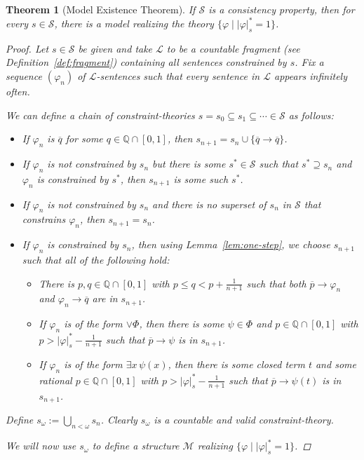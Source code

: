 \documentclass{amsart}
\newtheorem{theorem}{Theorem}[section]
\theoremstyle{definition}
\numberwithin{equation}{theorem}
\renewcommand{\phi}{\varphi}
\newcommand{\Q}{\mathbb{Q}}
\newcommand{\where}{\mid}
\newcommand{\unvee}{{\vee}}
\newcommand{\rat}[1]{{\overline{#1}}}
\newcommand{\narrow}[1]{\xrightarrow{#1}}
\renewcommand{\to}{\narrow{}}
\newcommand{\frag}{\mathcal{L}}
\begin{document}
\begin{theorem}[Model Existence Theorem]
  If $\mathscr{S}$ is a consistency property, then for every $s\in \mathscr{S}$, there is a model realizing the theory $\{\phi\where |\phi|^*_s=1\}$.
  \begin{proof}
    Let $s\in \mathscr{S}$ be given and take $\frag$ to be a countable fragment (see Definition~\ref{def:fragment}) containing all sentences constrained by $s$.
    Fix a sequence $(\phi_n)$ of $\mathcal L$-sentences such that every sentence in $\mathcal L$ appears infinitely often.
    
    We can define a chain of constraint-theories $s=s_0\subseteq s_1\subseteq\cdots\in \mathscr{S}$ as follows:
    \begin{itemize}
    \item If $\phi_n$ is $\rat q$ for some $q\in\Q\cap[0,1]$, then $s_{n+1}=s_n\cup\{\rat q\to\rat q\}$.
    \item If $\phi_n$ is not constrained by $s_n$ but there is some $s^*\in \mathscr{S}$ such that $s^*\supseteq s_n$ and $\phi_n$ is constrained by $s^*$, then $s_{n+1}$ is some such $s^*$.
    \item If $\phi_n$ is not constrained by $s_n$ and there is no superset of $s_n$ in $\mathscr{S}$ that constrains $\phi_n$, then $s_{n+1}=s_n$.
    \item If $\phi_n$ is constrained by $s_n$, then using Lemma~\ref{lem:one-step}, we choose $s_{n+1}$ such that all of the following hold:
	    \begin{itemize}
		  \item 
		    There is $p,q\in\Q\cap[0,1]$ with $p\leq q<p+\tfrac1{n+1}$ such that both $\rat p\to\phi_n$ and $\phi_n\to\rat q$ are in $s_{n+1}$.
		  \item 
		    If $\phi_n$ is of the form $\unvee\Phi$, then there is some $\psi\in\Phi$ and $p\in\Q\cap[0,1]$ with $p>|\phi|^*_s-\tfrac1{n+1}$ such that $\rat p\to\psi$ is in $s_{n+1}$.
		  \item 
		    If $\phi_n$ is of the form $\exists x\,\psi(x)$, then there is some closed term $t$ and some rational $p\in\Q\cap[0,1]$ with $p>|\phi|^*_s-\tfrac{1}{n+1}$ such that $\rat p\to\psi(t)$ is in $s_{n+1}$.
		  \end{itemize}
    \end{itemize}	  
	  Define $s_\omega:=\bigcup\limits_{n<\omega}s_n$.
	  Clearly $s_\omega$ is a countable and valid constraint-theory.
	  
	  We will now use $s_\omega$ to define a structure $\mathcal M$ realizing $\{\phi\where|\phi|^*_s=1\}$.
    

\end{proof}
\end{theorem}
\end{document}
